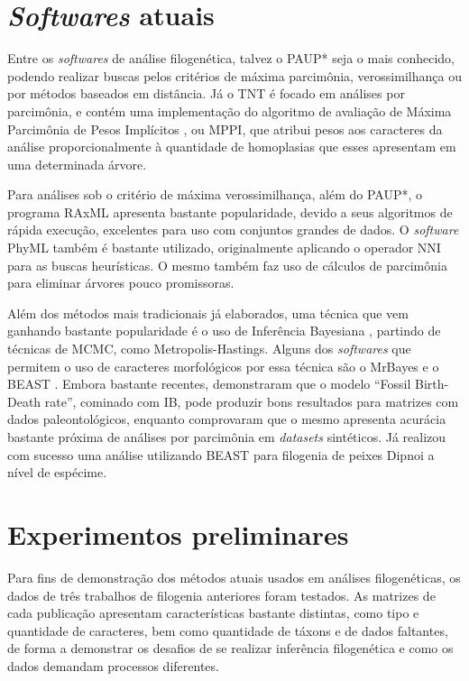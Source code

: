 \documentclass[12pt]{article}
\begin{document}

\section{\emph{Softwares} atuais}

Entre os \emph{softwares} de análise filogenética, talvez o PAUP* \cite{paup} seja o mais conhecido, podendo realizar buscas pelos critérios de máxima parcimônia, verossimilhança ou por métodos baseados em distância. Já o TNT \cite{tnt} é focado em análises por parcimônia, e contém uma implementação do algoritmo de avaliação de Máxima Parcimônia de Pesos Implícitos \cite{iwmp}, ou MPPI, que atribui pesos aos caracteres da análise proporcionalmente à quantidade de homoplasias que esses apresentam em uma determinada árvore.

Para análises sob o critério de máxima verossimilhança, além do PAUP*, o programa RAxML \cite{raxml} apresenta bastante popularidade, devido a seus algoritmos de rápida execução, excelentes para uso com conjuntos grandes de dados. O \emph{software} PhyML \cite{phyml} também é bastante utilizado, originalmente aplicando o operador NNI para as buscas heurísticas. O mesmo também faz uso de cálculos de parcimônia para eliminar árvores pouco promissoras.

Além dos métodos mais tradicionais já elaborados, uma técnica que vem ganhando bastante popularidade é o uso de Inferência Bayesiana \cite{tschopp2018challenges}, partindo de técnicas de MCMC, como Metropolis-Hastings. Alguns dos \emph{softwares}  que permitem o uso de caracteres morfológicos por essa técnica são o MrBayes \cite{mr-bayes} e o BEAST \cite{beast}. Embora bastante recentes, \cite{mongiardino2021fossils} demonstraram que o modelo ``Fossil Birth-Death rate'', cominado com IB, pode produzir bons resultados para matrizes com dados paleontológicos, enquanto \cite{implied-ranting} comprovaram que o mesmo apresenta acurácia bastante próxima de análises por parcimônia em \emph{datasets} sintéticos. Já \cite{cau2017specimen} realizou com sucesso uma análise utilizando BEAST para filogenia de peixes Dipnoi a nível de espécime.

\section{Experimentos preliminares}

Para fins de demonstração dos métodos atuais usados em análises filogenéticas, os dados de três trabalhos de filogenia anteriores foram testados. As matrizes de cada publicação apresentam características bastante distintas, como tipo e quantidade de caracteres, bem como quantidade de táxons e de dados faltantes, de forma a demonstrar os desafios de se realizar inferência filogenética e como os dados demandam processos diferentes.
\end{document}
